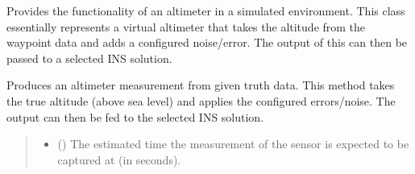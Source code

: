 \documentclass[letterpaper,10pt,english]{sphinxmanual}
\begin{document}
\begin{fulllineitems}
\label{\detokenize{modules/measurement/altimeter:qnav.measurement.altimeter.Altimeter}}
\pysigstartsignatures
{}
\pysigstopsignatures
\sphinxAtStartPar
Provides the functionality of an altimeter in a simulated environment.
This class essentially represents a virtual altimeter that takes the
altitude from the waypoint data and adds a configured noise/error.
The output of this can then be passed to a selected INS solution.

\begin{fulllineitems}
\label{\detokenize{modules/measurement/altimeter:qnav.measurement.altimeter.Altimeter.take_measurement}}
\pysigstartsignatures
{}
\pysigstopsignatures
\sphinxAtStartPar
Produces an altimeter measurement from given truth data.
This method takes the true altitude (above sea level) and
applies the configured errors/noise. The output can then be
fed to the selected INS solution.
\begin{quote}\begin{description}
\begin{itemize}
\item {} 
\sphinxAtStartPar
{} () \textendash{} The estimated time the measurement of the sensor
is expected to be captured at (in seconds).


\end{itemize}
\end{description}
\end{quote}
\end{fulllineitems}
\end{fulllineitems}
\end{document}
